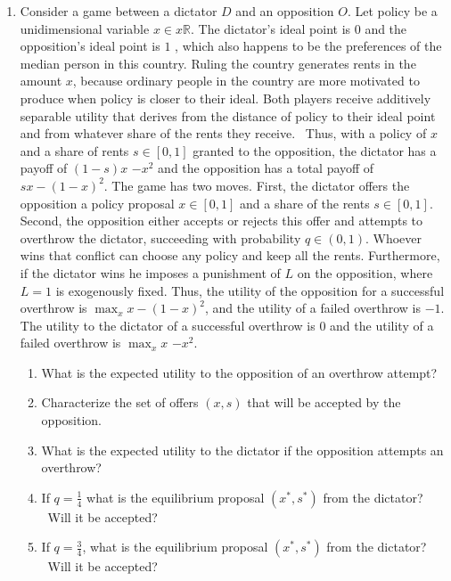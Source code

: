 \documentclass[fleqn,titlepage,12pt]{article}
\begin{document}
\begin{enumerate}
\item Consider a game between a dictator $D$ and an opposition $O$. Let
policy be a unidimensional variable $x\in 
x\mathbb{R}
$. The dictator's ideal point is $0$ and the opposition's ideal point is $1$%
, which also happens to be the preferences of the median person in this
country. Ruling the country generates rents in the amount $x$, because
ordinary people in the country are more motivated to produce when policy is
closer to their ideal. Both players receive additively separable utility
that derives from the distance of policy to their ideal point and from
whatever share of the rents they receive. \ Thus, with a policy of $x$ and a
share of rents $s\in \left[ 0,1\right] $ granted to the opposition, the
dictator has a payoff of $\left( 1-s\right) x$ $-x^{2}$ and the opposition
has a total payoff of $sx-\left( 1-x\right) ^{2}$. The game has two moves.
First, the dictator offers the opposition a policy proposal $x\in \left[ 0,1%
\right] $ and a share of the rents $s\in \left[ 0,1\right] $. Second, the
opposition either accepts or rejects this offer and attempts to overthrow
the dictator, succeeding with probability $q\in \left( 0,1\right) $. Whoever
wins that conflict can choose any policy and keep all the rents.
Furthermore, if the dictator wins he imposes a punishment of $L$ on the
opposition, where $L=1$ is exogenously fixed. Thus, the utility of the
opposition for a successful overthrow is $\max_{x}x-\left( 1-x\right) ^{2}$,
and the utility of a failed overthrow is $-1$. The utility to the dictator
of a successful overthrow is $0$ and the utility of a failed overthrow is $%
\max_{x}x$ $-x^{2}$.

\begin{enumerate}
\item What is the expected utility to the opposition of an overthrow attempt?

\item Characterize the set of offers $\left( x,s\right) $ that will be
accepted by the opposition.

\item What is the expected utility to the dictator if the opposition
attempts an overthrow?

\item If $q=\frac{1}{4}$ what is the equilibrium proposal $\left( x^{\ast
},s^{\ast }\right) $ from the dictator? \ Will it be accepted?

\item If $q=\frac{3}{4}$, what is the equilibrium proposal $\left( x^{\ast
},s^{\ast }\right) $ from the dictator? \ Will it be accepted?


\end{enumerate}
\end{enumerate}
\end{document}
